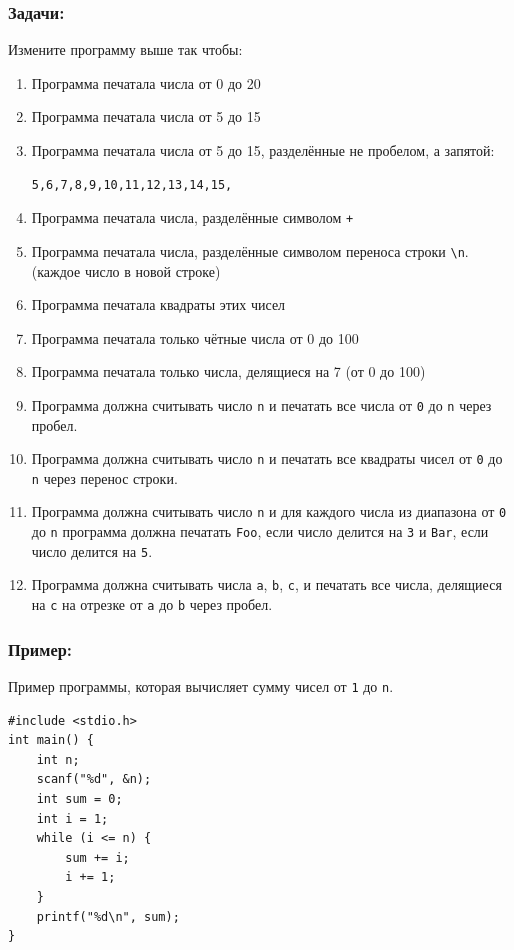 \documentclass{article}
\begin{document}
\subsubsection*{Задачи:}
Измените программу выше так чтобы:
\begin{enumerate}
\item Программа печатала числа от 0 до 20
\item Программа печатала числа от 5 до 15
\item Программа печатала числа от 5 до 15, разделённые не пробелом, а запятой:
\begin{verbatim}
5,6,7,8,9,10,11,12,13,14,15,
\end{verbatim}
\item Программа печатала числа, разделённые символом \texttt{+}
\item Программа печатала числа, разделённые символом переноса строки \texttt{\textbackslash n}. (каждое число в новой строке)
\item Программа печатала квадраты этих чисел
\item Программа печатала только чётные числа от 0 до 100
\item Программа печатала только числа, делящиеся на 7  (от 0 до 100)
\item Программа должна считывать число \texttt{n} и печатать все числа от \texttt{0} до \texttt{n} через пробел.
\item Программа должна считывать число \texttt{n} и печатать все квадраты чисел от \texttt{0} до \texttt{n} через перенос строки.
\item Программа должна считывать число \texttt{n} и для каждого числа из диапазона от \texttt{0} до \texttt{n} программа должна печатать \texttt{Foo}, если число делится на \texttt{3} и \texttt{Bar}, если число делится на \texttt{5}.
\item Программа должна считывать числа \texttt{a}, \texttt{b}, \texttt{c}, и печатать все числа, делящиеся на \texttt{c} на отрезке от \texttt{a} до \texttt{b} через пробел.
\end{enumerate}

\subsubsection*{Пример:}
Пример программы, которая вычисляет сумму чисел от \texttt{1} до \texttt{n}.
\begin{lstlisting}
#include <stdio.h>
int main() {
    int n;
    scanf("%d", &n);
    int sum = 0;
    int i = 1;
    while (i <= n) {
        sum += i;
        i += 1;
    }
    printf("%d\n", sum);
}
\end{lstlisting}
\end{document}
